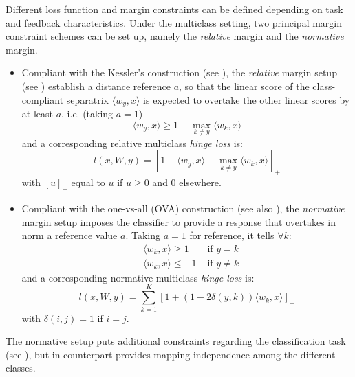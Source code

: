 \documentclass[preprint,12pt,authoryear]{elsarticle}
\begin{document}
Different loss function and margin constraints can be defined depending on task and feedback characteristics. 
Under the multiclass setting, two principal margin constraint schemes can be set up, namely the \emph{relative} margin and the \emph{normative} margin. 

\begin{itemize}
	\item Compliant with the Kessler's construction (see \cite{duda1973pattern}), the \emph{relative} margin setup (see \cite{crammer2003ultraconservative}) establish a distance reference $a$, so that the linear score of the class-compliant separatrix $\langle w_y, x\rangle$ is expected to overtake  the other linear scores by at least $a$, i.e. (taking $a=1$)
	\begin{equation}
	\label{eq:rel} \langle w_y, x \rangle \geq 1 + \max_{k \neq y} \langle w_k, x \rangle  	
	\end{equation}
	and a corresponding relative multiclass \emph{hinge loss} is:
	\begin{equation}
	\label{eq:rel-loss} l (x,W,y) =  \left[ 1 +  \langle w_y, x \rangle - \max_{k \neq y} \langle w_k, x\rangle\right]_+\end{equation}
	with $[u]_+$ equal to $u$ if $u\geq 0$ and 0 elsewhere.
	\item  Compliant with the one-vs-all (OVA) construction (see also \cite{allwein2000reducing}), the \emph{normative} margin setup imposes the classifier to provide a response that overtakes in norm a reference value $a$. Taking  $a = 1$ for reference, it tells $\forall k$: \begin{align}%
	&\langle w_k, x \rangle \geq 1 &\text{ if } y = k \label{eq:OVA-A}\\
	&\langle w_k, x \rangle \leq -1 &\text{ if }y \neq k \label{eq:OVA-B}
	\end{align}
	and a corresponding normative multiclass \emph{hinge loss} is:  
	\begin{equation}\label{eq:OVA-loss} l(x,W,y) = \sum_{k=1}^K \left[1 + (1 - 2 \delta(y,k)) \langle w_k,x \rangle\right]_+
	\end{equation}
	with $\delta(i,j) =1$ if $i = j$.
\end{itemize}


The normative setup puts additional constraints regarding the classification task (see \cite{crammer2003ultraconservative}), but in counterpart provides mapping-independence among the different classes.

\end{document}

